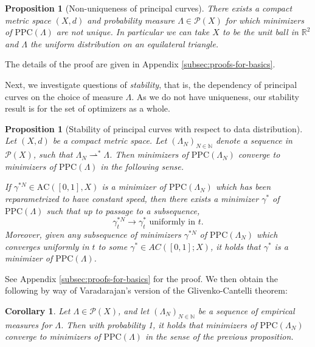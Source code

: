 \documentclass[aos, preprint]{imsart}
\theoremstyle{plain}
\newtheorem{prop}[theorem]{Proposition}
\newtheorem{cor}[theorem]{Corollary}
\theoremstyle{remark}
\begin{document}
\begin{prop}[Non-uniqueness of principal curves]
\label{prop:r2-nonuniqueness}
There exists a compact metric space $(X,d)$ and probability measure
$\Lambda\in\mathcal{P}(X)$ for which minimizers of $\mathrm{PPC}(\Lambda)$
are not unique. In particular we can take $X$ to be the unit ball
in $\mathbb{R}^{2}$ and $\Lambda$ the uniform distribution on an equilateral
triangle.
\end{prop}

The details of the proof are given in Appendix \ref{subsec:proofs-for-basics}.

Next, we investigate questions of \emph{stability}, that is, the dependency of principal curves on
the choice of measure $\Lambda$. As we do not have uniqueness,
  our stability result is for the set of optimizers as a
  whole.




\begin{prop}[Stability of principal curves with respect to data distribution]
\label{prop:gamma-m-gamma}
  Let $(X,d)$ be a compact metric space. Let $(\Lambda_{N})_{N \in
    \mathbb{N}}$ denote a sequence in $\mathcal{P}(X)$, such that
  $\Lambda_{N} \rightharpoonup^{*} \Lambda$. Then minimizers of
  $\mathrm{PPC}(\Lambda_{N})$ converge to minimizers of
  $\mathrm{PPC}(\Lambda)$ in the following sense.

  If
  $\gamma^{*N}\in\text{AC}([0,1],X)$ is a minimizer of
  $\mathrm{PPC}(\Lambda_{N})$ which has been reparametrized to have
  constant speed, then there exists a minimizer $\gamma^{*}$ of
  $\mathrm{PPC}(\Lambda)$ such that up to passage to a subsequence,
  \[
    \gamma_{t}^{*N}\rightarrow\gamma_{t}^{*}\text{ uniformly in }t.
  \]
  Moreover, given any subsequence of minimizers $\gamma^{*N}$ of $\mathrm{PPC}(\Lambda_{N})$
which converges uniformly in $t$ to some $\gamma^{*}\in AC([0,1];X)$,
it holds that $\gamma^{*}$ is a minimizer of $\mathrm{PPC}(\Lambda)$.
\end{prop}


See Appendix \ref{subsec:proofs-for-basics} for the proof.  We then
obtain the following by way of Varadarajan's version \cite{varadarajan1958} of the Glivenko-Cantelli theorem:
\begin{cor}
  Let $\Lambda\in\mathcal{P}(X)$, and let $(\Lambda_{N})_{N \in
    \mathbb{N}}$ be a sequence of empirical measures for $\Lambda$.
  Then with probability 1, it holds that minimizers of
  $\mathrm{PPC}(\Lambda_{N})$ converge to minimizers of
  $\mathrm{PPC}(\Lambda)$ in the sense of the previous proposition.
\end{cor}
\end{document}
